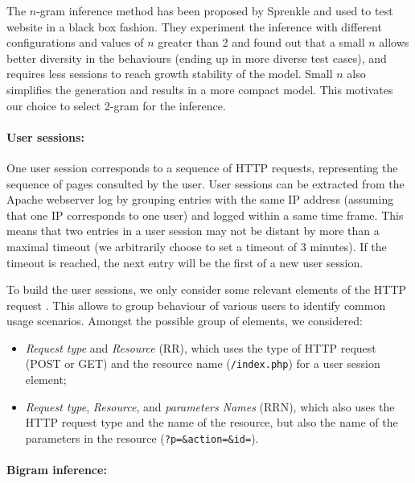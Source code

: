 The $n$-gram inference method has been proposed by Sprenkle \etal \cite{Sprenkle2011a,Sprenkle2013} and used to test website in a black box fashion. They experiment the inference with different configurations and values of $n$ greater than 2 and found out that a small $n$ allows better diversity in the behaviours (ending up in more diverse test cases), and requires less sessions to reach growth stability of the model. Small $n$ also simplifies the generation and results in a more compact model. This motivates our choice to select 2-gram for the inference.


\paragraph{User sessions:}

One user session corresponds to a sequence of HTTP requests, representing the sequence of pages consulted by the user. User sessions can be extracted from the Apache webserver log by grouping entries with the same IP address (assuming that one IP corresponds to one user) and logged within a same time frame. This means that two entries in a user session may not be distant by more than a maximal timeout (we arbitrarily choose to set a timeout of 3 minutes). If the timeout is reached, the next entry will be the first of a new user session.

To build the user sessions, we only consider some relevant elements of the HTTP request \cite{Sprenkle2013}. This allows to group behaviour of various users to identify common usage scenarios. Amongst the possible group of elements, we considered:
\begin{itemize}
\item \emph{Request type} and \emph{Resource} (RR), which uses the type of HTTP request (\eg PO\-ST or GET) and the resource name (\eg \texttt{/index.php}) for a user session element;
\item \emph{Request type}, \emph{Resource}, and \emph{parameters Names} (RRN), which also uses the HTTP request type and the name of the resource, but also the name of the parameters in the resource (\eg \verb|?p=&action=&id=|).
\end{itemize}

 
\paragraph{Bigram inference:}

